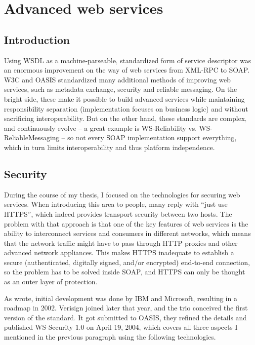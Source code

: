 \section{Advanced web services}

\subsection{Introduction}

Using WSDL as a machine-parseable, standardized form of service descriptor was an enormous improvement on the way of web services from XML-RPC to SOAP. W3C and OASIS standardized many additional methods of improving web services, such as metadata exchange, security and reliable messaging. On the bright side, these make it possible to build advanced services while maintaining responsibility separation (implementation focuses on business logic) and without sacrificing interoperability. But on the other hand, these standards are complex, and continuously evolve -- a great example is WS-Reliability vs. WS-ReliableMessaging -- so not every SOAP implementation support everything, which in turn limits interoperability and thus platform independence.

\subsection{Security}

During the course of my thesis, I focused on the technologies for securing web services. When introducing this area to people, many reply with ``just use HTTPS'', which indeed provides transport security between two hosts. The problem with that approach is that one of the key features of web services is the ability to interconnect services and consumers in different networks, which means that the network traffic might have to pass through HTTP proxies and other advanced network appliances. This makes HTTPS inadequate to establish a secure (authenticated, digitally signed, and/or encrypted) end-to-end connection, so the problem has to be solved inside SOAP, and HTTPS can only be thought as an outer layer of protection.

As \cite{wiley-wss} wrote, initial development was done by IBM and Microsoft, resulting in a roadmap in 2002. Verisign joined later that year, and the trio conceived the first version of the standard. It got submitted to OASIS, they refined the details and published WS\hyp{}Security 1.0 on April 19, 2004, which covers all three aspects I mentioned in the previous paragraph using the following technologies.

